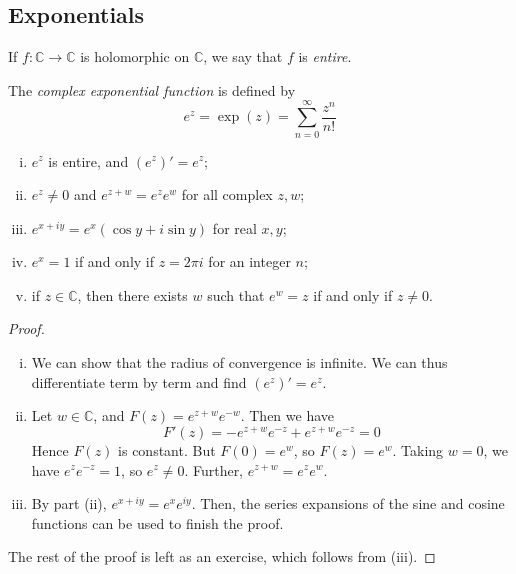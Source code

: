 \subsection{Exponentials}
\begin{definition}
	If \( f \colon \mathbb C \to \mathbb C \) is holomorphic on \( \mathbb C \), we say that \( f \) is \textit{entire}.
\end{definition}
\begin{definition}
	The \textit{complex exponential function} is defined by
	\[ e^z = \exp(z) = \sum_{n=0}^\infty \frac{z^n}{n!} \]
\end{definition}
\begin{proposition}
	\begin{enumerate}[(i)]
		\item \( e^z \) is entire, and \( (e^z)' = e^z \);
		\item \( e^z \neq 0 \) and \( e^{z+w} = e^z e^w \) for all complex \( z, w \);
		\item \( e^{x+iy} = e^x(\cos y + i \sin y) \) for real \( x, y \);
		\item \( e^x = 1 \) if and only if \( z = 2 \pi i \) for an integer \( n \);
		\item if \( z \in \mathbb C \), then there exists \( w \) such that \( e^w = z \) if and only if \( z \neq 0 \).
	\end{enumerate}
\end{proposition}
\begin{proof}
	\begin{enumerate}[(i)]
		\item We can show that the radius of convergence is infinite.
			We can thus differentiate term by term and find \( (e^z)' = e^z \).
		\item Let \( w \in \mathbb C \), and \( F(z) = e^{z+w} e^{-w} \).
			Then we have
			\[ F'(z) = -e^{z+w} e^{-z} + e^{z+w} e^{-z} = 0 \]
			Hence \( F(z) \) is constant. But \( F(0) = e^w \), so \( F(z) = e^w \).
			Taking \( w = 0 \), we have \( e^z e^{-z} = 1 \), so \( e^z \neq 0 \).
			Further, \( e^{z+w} = e^z e^w \).
		\item By part (ii), \( e^{x+iy} = e^x e^{iy} \).
			Then, the series expansions of the sine and cosine functions can be used to finish the proof.
	\end{enumerate}
	The rest of the proof is left as an exercise, which follows from (iii).
\end{proof}

